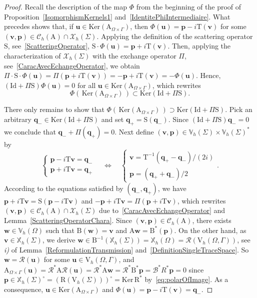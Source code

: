 \documentclass[10pt,a4paper]{amsart}
\newcommand{\Id}{\mathrm{Id}}
\newcommand{\Vh}{\mathrm{V}_{h}}
\newcommand{\bp}{\boldsymbol{p}}
\newcommand{\bq}{\boldsymbol{q}}
\newcommand{\bu}{\boldsymbol{u}}
\newcommand{\bv}{\boldsymbol{v}}
\newcommand{\bw}{\boldsymbol{w}}
\newcommand{\mA}{\mathrm{A}}
\newcommand{\mB}{\mathrm{B}}
\newcommand{\mR}{\mathrm{R}}
\newcommand{\mS}{\mathrm{S}}
\newcommand{\mT}{\mathrm{T}}
\newcommand{\mbV}{\mathbb{V}}
\newcommand{\mbX}{\mathbb{X}}
\newcommand{\mrm}{\mathrm}
\begin{document}
\begin{proof}
Recall the description of the map $\Phi$ from the beginning of the
proof of Proposition~\ref{IsomorphismKernels1} and~\eqref{IdentitePhiIntermediaire}. What precedes shows that, if $\bu\in
\mrm{Ker}(\mA_{\Omega\times\Gamma})$, then $\Phi(\bu) = \bp-i\mT(\bv)$
for some $(\bv,\bp)\in \mathscr{C}_h(\mA)\cap\mathscr{X}_h(\Sigma)$.
Applying the definition of the scattering operator $\mS$, see~\eqref{ScatteringOperator}, $\mS\cdot\Phi(\bu) =
\bp+i\mT(\bv)$. Then, applying the characterization of $\mathscr{X}_h(\Sigma)$ with the exchange operator
$\Pi$, see~\eqref{CaracAvecEchangeOperator}, we obtain
$\Pi\cdot\mS\cdot\Phi(\bu) = \Pi(\bp+i\mT(\bv)) = -\bp+i\mT(\bv) =
-\Phi(\bu)$. Hence, $(\Id + \Pi\mS)\Phi(\bu) = 0$ for all \(\bu\in
\mrm{Ker}(\mA_{\Omega\times\Gamma})\), which rewrites
\begin{equation*}
  \Phi(\,\mrm{Ker}(\mA_{\Omega\times\Gamma})\,)\subset \mrm{Ker}(\Id + \Pi\mS).
\end{equation*}

There only remains to show that
$\Phi(\,\mrm{Ker}(\mA_{\Omega\times\Gamma})\,) \supset \mrm{Ker}(\Id +
\Pi\mS)$. Pick an arbitrary $\bq_-\in \mrm{Ker}(\Id + \Pi\mS)$ and
set $\bq_+ = \mS(\bq_-)$. Since $(\Id + \Pi\mS)\bq_- = 0$ we
conclude that $\bq_-+\Pi(\bq_+) = 0$. Next define $(\bv,\bp)\in
\mbV_h(\Sigma)\times \mbV_h(\Sigma)^*$ by
\begin{equation*}
  \left\{
  \begin{array}{l}
    \bp-i\mT\bv = \bq_-\\
    \bp+i\mT\bv = \bq_+
  \end{array}
  \right.
  \quad\iff\quad
  \left\{
  \begin{array}{l}
    \bv = \mT^{-1}(\bq_+ -\bq_-)/(2i)\\
    \bp = (\bq_+ + \bq_-)/2
  \end{array}
  \right.
  .
\end{equation*}
According to the equations satisfied by $(\bq_-,\bq_+)$, we
have $\bp+i\mT\bv = \mS(\bp-i\mT\bv)$ and $-\bp+i\mT\bv =
\Pi(\bp+i\mT\bv)$, which rewrites
$(\bv,\bp)\in\mathscr{C}_h(\mA)\cap\mathscr{X}_h(\Sigma)$ due to~\eqref{CaracAvecEchangeOperator} and Lemma~\ref{ScatteringOperatorChara}.
Since $(\bv,\bp)\in\mathscr{C}_h(\mA)$, there exists $\bw\in
\mbV_h(\Omega)$ such that $\mB(\bw) = \bv$ and $\mA\bw =
\mB^*(\bp)$. On the other hand, as $\bv\in\mbX_h(\Sigma)$, we derive
$\bw\in \mB^{-1}(\mbX_h(\Sigma)) = \mbX_h(\Omega) =
\mathcal{R}(\Vh(\Omega,\Gamma))$, see \textit{i)} of Lemma~\ref{ReformulationTransmission} and~\eqref{DefinitionSingleTraceSpace}. So $\bw = \mathcal{R}(\bu)$ for
some $\bu\in \Vh(\Omega,\Gamma)$, and
$\mA_{\Omega\times\Gamma}(\bu) = \mathcal{R}^*\mA\mathcal{R}(\bu) =
\mathcal{R}^*\mA\bw = \mathcal{R}^*\mB^*\bp = \mathcal{B}^*R^*\bp = 0$ since $\bp\in
\mbX_h(\Sigma)^{\circ} = (\mR(\Vh(\Sigma)))^\circ = \mrm{Ker}\,\mR^*$ by~\eqref{eq:polarOfImage}. As a consequence, $\bu \in
\mrm{Ker}(\mA_{\Omega\times\Gamma})$ and $\Phi(\bu) = \bp-i\mT(\bv) =
\bq_-$. 
\end{proof}
\end{document}
